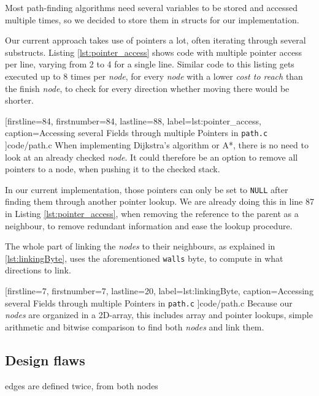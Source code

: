 Most path-finding algorithms need several variables to be stored and accessed multiple times,
so we decided to store them in structs for our implementation.


Our current approach takes use of pointers a lot,
often iterating through several substructs.
Listing \ref{lst:pointer_access} shows code with multiple pointer access per line,
varying from 2 to 4 for a single line.
Similar code to this listing gets executed up to 8 times per \emph{node},
for every \emph{node} with a lower \emph{cost to reach} than the finish \emph{node},
to check for every direction whether moving there would be shorter.


[firstline=84,				%
firstnumber=84,
lastline=88,
label=lst:pointer_access,	%
caption={Accessing several Fields through multiple Pointers in {\tt path.c}}
]{code/path.c}
%
When implementing Dijkstra's algorithm or A*,
there is no need to look at an already checked \emph{node}.
It could therefore be an option to remove all pointers to a node,
when pushing it to the checked stack.

In our current implementation,
those pointers can only be set to {\tt NULL} after finding them through another pointer lookup.
We are already doing this in line 87 in Listing \ref{lst:pointer_access},
when removing the reference to the parent as a neighbour,
to remove redundant information and ease the lookup procedure.

The whole part of linking the \emph{nodes} to their neighbours,
as explained in \ref{lst:linkingByte},
uses the aforementioned {\tt walls} byte,
to compute in what directions to link.


[firstline=7,				%
firstnumber=7,
lastline=20,
label=lst:linkingByte,	%
caption={Accessing several Fields through multiple Pointers in {\tt path.c}}
]{code/path.c}
%
Because our \emph{nodes} are organized in a 2D-array,
this includes array and pointer lookups,
simple arithmetic and
bitwise comparison
to find both \emph{nodes} and link them.

\subsection{Design flaws}
edges are defined twice, from both nodes
